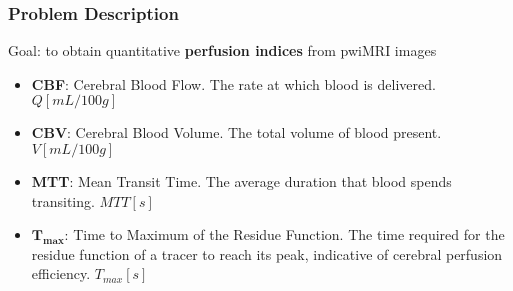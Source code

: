 %
%

\begin{frame}
  \frametitle{Problem Description}
    Goal: to obtain quantitative \textbf{perfusion indices} from pwiMRI images
    \begin{itemize}
        \item \textbf{CBF}: Cerebral Blood Flow. The rate at which blood is delivered. $Q [mL/100g]$
        \item \textbf{CBV}: Cerebral Blood Volume. The total volume of blood present. $V[mL/100g]$
        \item \textbf{MTT}: Mean Transit Time. The average duration that blood spends transiting. $MTT[s]$
        \item $\mathbf{T_{max}}$: Time to Maximum of the Residue Function. The time required for the residue function of a tracer to reach its peak, indicative of cerebral perfusion efficiency. $T_{max}[s]$
    \end{itemize}

\end{frame}

